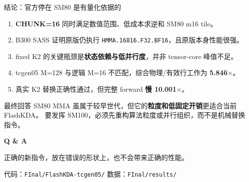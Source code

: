 \documentclass[aspectratio=169,10pt]{beamer}
\newcommand{\bad}[1]{\textcolor{KdaRed}{\textbf{#1}}}
\newcommand{\key}[1]{\textcolor{KdaBlue}{\textbf{#1}}}
\newcommand{\code}[1]{\texttt{#1}}
\begin{document}
\begin{frame}{结论：官方停在 SM80 是有量化依据的}
  \begin{enumerate}
    \item \key{CHUNK=16} 同时满足数值范围、低成本求逆和 SM80 m16 tile。
    \item B300 SASS 证明原版仍执行 \code{HMMA.16816.F32.BF16}，且原版本身性能很强。
    \item fixed K2 的关键瓶颈是\key{状态依赖与低并行度}，并非 tensor-core 峰值不足。
    \item tcgen05 M=128 与逻辑 M=16 不匹配，综合物理/有效行工作为 \bad{5.846$\times$}。
    \item 真实 K2 替换正确性通过，但完整 forward \bad{慢 10.001$\times$}。
  \end{enumerate}

  \vspace{0.8em}
  \begin{block}{最终回答}
    SM80 MMA 虽属于较早世代，但它的\textbf{粒度和低固定开销}更适合当前 FlashKDA。
    要发挥 SM100，必须先重构算法粒度或并行组织，而不是机械替换指令。
  \end{block}

\end{frame}

{
\begin{frame}[plain]
  \centering
  \vfill
  {\color{white}\Huge\bfseries Q \& A}

  \vspace{1.1em}
  {\color{KdaCyan}\Large 正确的新指令，放在错误的形状上，也不会带来正确的性能。}

  \vspace{2.0em}
  {\color{white!70}\small
    代码：\code{FInal/FlashKDA-tcgen05/}\qquad
    数据：\code{FInal/results/}}
  \vfill
\end{frame}
}
\end{document}
